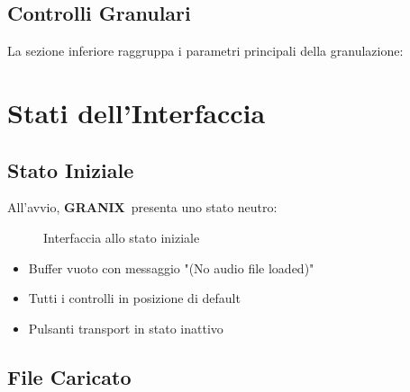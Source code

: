 \documentclass[a4paper,11pt,openany]{book}
\newcommand{\granix}{\textbf{\textcolor{granixblue}{GRANIX}}}
\begin{document}
\subsection{Controlli Granulari}

La sezione inferiore raggruppa i parametri principali della granulazione:

\section{Stati dell'Interfaccia}

\subsection{Stato Iniziale}

All'avvio, \granix\ presenta uno stato neutro:

\begin{figure}[H]
    \centering
    \caption{Interfaccia allo stato iniziale}
    \label{fig:interface_initial}
\end{figure}

\begin{itemize}
    \item Buffer vuoto con messaggio "(No audio file loaded)"
    \item Tutti i controlli in posizione di default
    \item Pulsanti transport in stato inattivo
\end{itemize}

\subsection{File Caricato}
\end{document}
